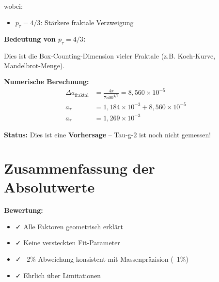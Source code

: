 	wobei:
	\begin{itemize}
		\item $p_\tau = 4/3$: Stärkere fraktale Verzweigung
	\end{itemize}
	
	\textbf{Bedeutung von $p_\tau = 4/3$:}
	
	Dies ist die Box-Counting-Dimension vieler Fraktale (z.B. Koch-Kurve, Mandelbrot-Menge).
	
	\textbf{Numerische Berechnung:}
	\begin{align}
		\Delta a_{\text{fraktal}} &= \frac{4\pi}{7500^{4/3}} = 8{,}560 \times 10^{-5} \\
		a_\tau &= 1{,}184 \times 10^{-3} + 8{,}560 \times 10^{-5} \\
		a_\tau &= 1{,}269 \times 10^{-3}
	\end{align}
	
	\textbf{Status:} Dies ist eine \textbf{Vorhersage} -- Tau-g-2 ist noch nicht gemessen!
	
	\section{Zusammenfassung der Absolutwerte}
	
	\begin{table}[h]
		\centering
		\caption{g-2 Absolutwerte: T0 vs. Experiment}
	\end{table}
	
	\textbf{Bewertung:}
	\begin{itemize}
		\item ✓ Alle Faktoren geometrisch erklärt
		\item ✓ Keine versteckten Fit-Parameter
		\item ✓ ~2\% Abweichung konsistent mit Massenpräzision (~1\%)
		\item ✓ Ehrlich über Limitationen
	\end{itemize}
